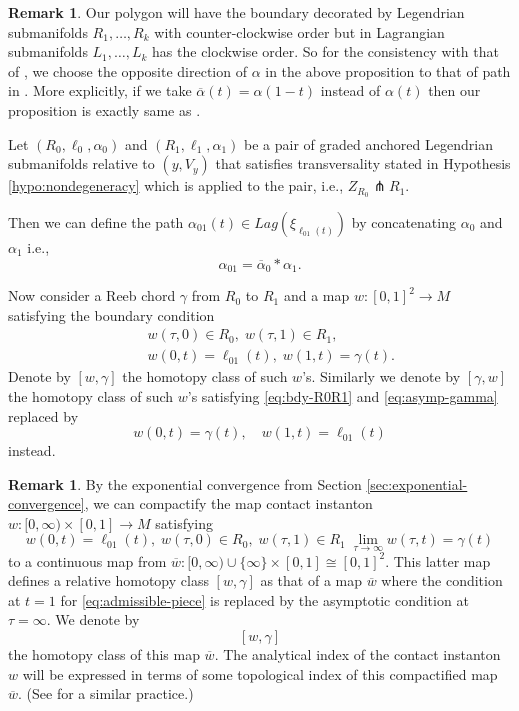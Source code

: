 \documentclass[reqno]{amsart}
\newcommand{\bea}{\begin{eqnarray}}
\newcommand{\eea}{\end{eqnarray}}
\theoremstyle{theorem}
\theoremstyle{definition}
\newtheorem{rem}[thm]{Remark}
\numberwithin{equation}{section}
\begin{document}
\begin{rem}
Our polygon will have the boundary decorated by Legendrian submanifolds $R_1,\ldots,R_k$ with counter-clockwise order but in \cite{fooo:anchored} Lagrangian submanifolds $L_1,\ldots,L_k$ has the clockwise order. So for the consistency with that of
\cite{fooo:anchored}, we choose the opposite direction of $\alpha$ in the above proposition to that of path in \cite[Proposition 5.3]{fooo:anchored}. More explicitly, if we take $\overline{\alpha}(t) = \alpha(1-t)$ instead of $\alpha(t)$ then our proposition is exactly same as \cite[Proposition 5.3]{fooo:anchored}.
\end{rem}

Let $(R_0,\ell_0,\alpha_0)$ and $(R_1,\ell_1,\alpha_1)$ be a pair of
graded anchored Legendrian submanifolds relative to $(y,V_y)$ that satisfies
transversality stated in Hypothesis \ref{hypo:nondegeneracy} which is applied to the pair, i.e.,
$Z_{R_0} \pitchfork R_1$.

Then we can define the path $\alpha_{01}(t) \in Lag(\xi_{\ell_{01}(t)})$
by concatenating $\alpha_0$ and $\alpha_1$ i.e.,
$$
\alpha_{01} = \overline{\alpha}_0\ast\alpha_1.
$$

Now consider a Reeb chord $\gamma$ from $R_0$ to $R_1$ and a map $w:[0,1]^2 \rightarrow M$ satisfying the boundary condition
\bea\label{eq:admissible-piece}
& &w(\tau,0) \in  R_0, \; w(\tau,1)\in R_1, \label{eq:bdy-R0R1}\\
& &w(0,t) =  \ell_{01}(t), \; w(1,t)=\gamma(t). \label{eq:asymp-gamma}
\eea
Denote by $[w,\gamma]$ the homotopy class of such $w$'s.
Similarly we denote by $[\gamma,w]$ the homotopy class of such $w$'s satisfying
\eqref{eq:bdy-R0R1} and \eqref{eq:asymp-gamma} replaced by
$$
w(0,t)=\gamma(t), \quad w(1,t)=\ell_{01}(t)
$$
instead.

\begin{rem}\label{rem:[w,gamma]} By the exponential convergence from Section \ref{sec:exponential-convergence},
we can compactify the map contact instanton $w: [0,\infty) \times [0,1] \to M$
satisfying
$$
w(0,t)=\ell_{01}(t), \; w(\tau,0)\in R_0, \; w(\tau,1)\in R_1 \; \lim_{\tau\rightarrow\infty}w(\tau,t) = \gamma(t)
$$
to a continuous map from $\overline w: [0,\infty) \cup \{\infty\} \times [0,1] \cong [0,1]^2$. This latter map
defines a  relative homotopy class $[w,\gamma]$ as that of a map $\overline w$
where the condition at $t =1$ for \eqref{eq:admissible-piece} is replaced by the
asymptotic condition at $\tau =\infty$. We denote by
$$
[w,\gamma]
$$
the homotopy class of this map $\overline w$. The analytical index of the contact instanton $w$ will
be expressed in terms of some topological index of this compactified map $\overline w$.
(See \cite{fooo:anchored} for a similar practice.)
\end{rem}
\end{document}

